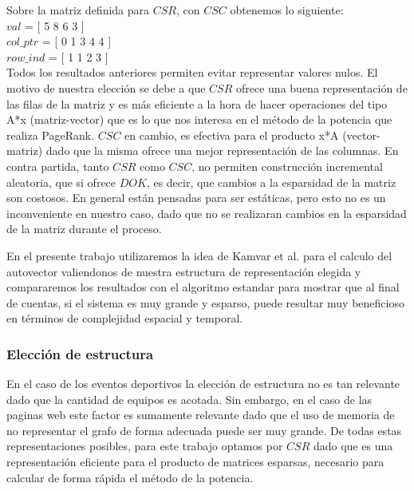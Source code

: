 Sobre la matriz definida para $CSR$, con $CSC$ obtenemos lo siguiente: \\

   $val$  = [ 5 8 6 3 ] \\
   $col\_ptr$ = [ 0 1 3 4 4 ] \\   
   $row\_ind$ = [ 1 1 2 3 ] \\

Todos los resultados anteriores permiten evitar representar valores nulos.	
El motivo de nuestra elección se debe a que $CSR$ ofrece una buena representación de las filas de la matriz y es más eficiente a la hora de hacer operaciones del tipo A*x (matriz-vector) que es lo que nos interesa en el método de la potencia que realiza PageRank. $CSC$ en cambio, es efectiva para el producto x*A (vector-matriz) dado que la misma ofrece una mejor representación de las columnas. En contra partida, tanto $CSR$ como $CSC$, no permiten construcción incremental aleatoria, que si ofrece $DOK$, es decir, que cambios a la esparsidad de la matriz son costosos. En general están pensadas para ser estáticas, pero esto no es un inconveniente en nuestro caso, dado que no se realizaran cambios en la esparsidad de la matriz durante el proceso.

En el presente trabajo utilizaremos la idea de Kamvar et al. \cite[Algoritmo 1]{Kamvar2003} para el calculo del autovector valiendonos de nuestra estructura de representación elegida y compararemos los resultados con el algoritmo estandar para mostrar que al final de cuentas, si el sistema es muy grande y esparso, puede resultar muy beneficioso en términos de complejidad espacial y temporal.

\subsubsection{Elección de estructura}
En el caso de los eventos deportivos la elección de estructura no es tan relevante dado que la cantidad de equipos es acotada. Sin embargo, en el caso de las paginas web este factor es sumamente relevante dado que el uso de memoria de no representar el grafo de forma adecuada puede ser muy grande. De todas estas representaciones posibles, para este trabajo optamos por $CSR$ dado que es una representación eficiente para el producto de matrices esparsas, necesario para calcular de forma rápida el método de la potencia.